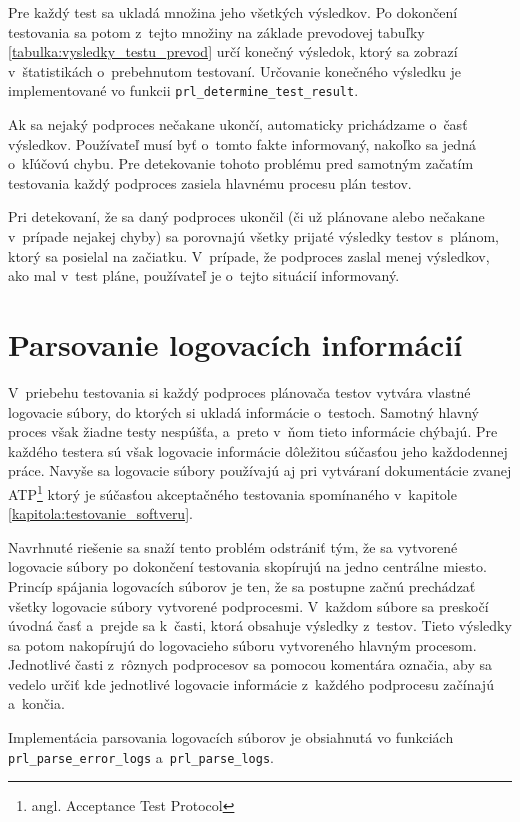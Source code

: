 Pre každý test sa ukladá množina jeho všetkých výsledkov. 
Po dokončení testovania sa potom z~tejto množiny na základe prevodovej
tabuľky \ref{tabulka:vysledky_testu_prevod} určí konečný výsledok,
ktorý sa zobrazí v~štatistikách o~prebehnutom testovaní.
Určovanie konečného výsledku je implementované vo funkcii \texttt{prl\_determine\_test\_result}.

Ak sa nejaký podproces nečakane ukončí, automaticky prichádzame o~časť výsledkov.
Používateľ musí byť o~tomto fakte informovaný, nakoľko sa jedná o~kľúčovú chybu.
Pre detekovanie tohoto problému pred samotným začatím testovania každý podproces
zasiela hlavnému procesu plán testov.

Pri detekovaní, že sa daný podproces ukončil (či už plánovane alebo nečakane v~prípade
nejakej chyby) sa porovnajú všetky prijaté výsledky testov s~plánom, ktorý sa posielal na
začiatku. V~prípade, že podproces zaslal menej výsledkov, ako mal v~test pláne,
používateľ je o~tejto situácií informovaný. 

\section{Parsovanie logovacích informácií}
\label{sekcia:parsovanie_logov}
V~priebehu testovania si každý podproces plánovača testov vytvára vlastné
logovacie súbory, do ktorých si ukladá informácie o~testoch.
Samotný hlavný proces však žiadne testy nespúšťa, a~preto v~ňom tieto informácie
chýbajú. Pre každého testera sú však logovacie informácie dôležitou súčasťou jeho
každodennej práce. Navyše sa logovacie súbory používajú aj pri vytváraní
dokumentácie zvanej ATP\footnote{angl. Acceptance Test Protocol} ktorý je súčasťou
akceptačného testovania spomínaného v~kapitole \ref{kapitola:testovanie_softveru}.

Navrhnuté riešenie sa snaží tento problém odstrániť tým, že sa vytvorené
logovacie súbory po dokončení testovania skopírujú na jedno centrálne miesto.
Princíp spájania logovacích súborov je ten, že sa postupne začnú prechádzať
všetky logovacie súbory vytvorené podprocesmi. V~každom súbore sa preskočí úvodná časť 
a~prejde sa k~časti, ktorá obsahuje výsledky z~testov. Tieto výsledky sa potom nakopírujú
do logovacieho súboru vytvoreného hlavným procesom. Jednotlivé časti z~rôznych podprocesov
sa pomocou komentára označia, aby sa vedelo určiť kde jednotlivé logovacie informácie
z~každého podprocesu začínajú a~končia.

Implementácia parsovania logovacích súborov je obsiahnutá vo funkciách \texttt{prl\_parse\_error\_logs}
a~\texttt{prl\_parse\_logs}. 
 

